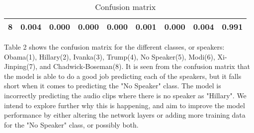 \documentclass[10pt,twocolumn,letterpaper]{article}
\begin{document}
\begin{table}[h]
\begin{tabular}{l|l|l|l|l|l|l|l|l|}
    \multicolumn{1}{|l|}{\textbf{8}} & 0.004                         & 0.000                         & 0.000                         & 0.000                         & 0.001                         & 0.000                         & 0.004                         & \cellcolor[HTML]{67FD9A}0.991 \\ \hline
    \end{tabular}
    \caption{Confusion matrix}
    \label{Confusion matrix}
\end{table}

Table 2 shows the confusion matrix for the different classes, or speakers: Obama(1), Hillary(2), Ivanka(3), Trump(4), No Speaker(5), Modi(6), Xi-Jinping(7), and Chadwick-Boseman(8). It is seen from the confusion matrix that the model is able to do a good job predicting each of the speakers, but it falls short when it comes to predicting the "No Speaker" class. The model is incorrectly predicting the audio clips where there is no speaker as "Hillary". We intend to explore further why this is happening, and aim to improve the model performance by either altering the network layers or adding more training data for the "No Speaker" class, or possibly both.


{\small


}
\end{document}
